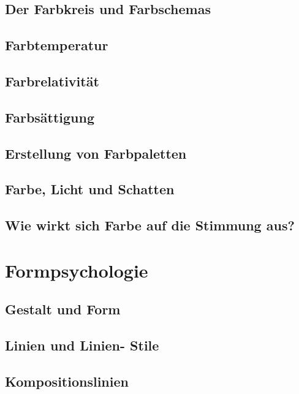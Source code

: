 \subsection{Der Farbkreis und Farbschemas}

\subsection{Farbtemperatur}

\subsection{Farbrelativität}

\subsection{Farbsättigung}

\subsection{Erstellung von Farbpaletten}

\subsection{Farbe, Licht und Schatten}

\subsection{Wie wirkt sich Farbe auf die Stimmung aus?}



\section{Formpsychologie}

\subsection{Gestalt und Form}

\subsection{Linien und Linien- Stile}

\subsection{Kompositionslinien}

